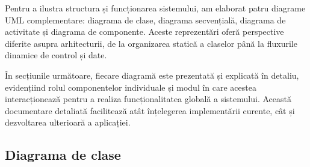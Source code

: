 \documentclass[12pt,a4paper]{article}
\begin{document}
Pentru a ilustra structura și funcționarea sistemului, am elaborat patru diagrame UML complementare: diagrama de clase, diagrama secvențială, diagrama de activitate și diagrama de componente. Aceste reprezentări oferă perspective diferite asupra arhitecturii, de la organizarea statică a claselor până la fluxurile dinamice de control și date.

În secțiunile următoare, fiecare diagramă este prezentată și explicată în detaliu, evidențiind rolul componentelor individuale și modul în care acestea interacționează pentru a realiza funcționalitatea globală a sistemului. Această documentare detaliată facilitează atât înțelegerea implementării curente, cât și dezvoltarea ulterioară a aplicației.
\subsection{Diagrama de clase}
\end{document}

